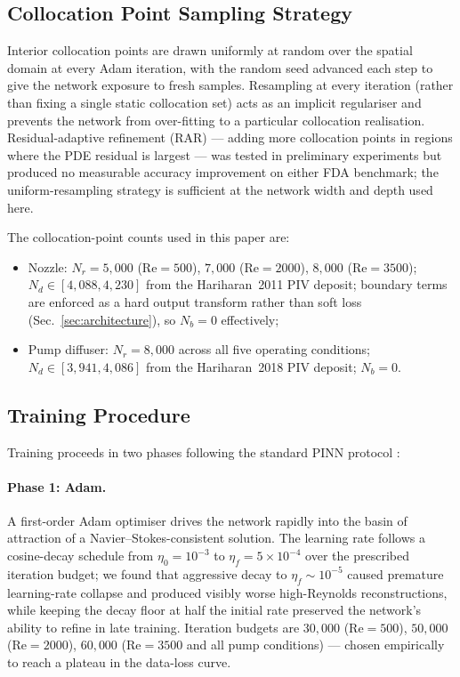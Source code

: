 \documentclass[12pt,a4paper]{article}
\newcommand{\Reyn}{\mathrm{Re}}    %
\begin{document}
\subsection{Collocation Point Sampling Strategy}
\label{sec:sampling}

Interior collocation points are drawn uniformly at random over
the spatial domain at every Adam iteration, with the random
seed advanced each step to give the network exposure to fresh
samples. Resampling at every iteration (rather than fixing a
single static collocation set) acts as an implicit regulariser
and prevents the network from over-fitting to a particular
collocation realisation. Residual-adaptive refinement (RAR)
\cite{Wu2023RAR} --- adding more collocation points in regions
where the PDE residual is largest --- was tested in preliminary
experiments but produced no measurable accuracy improvement on
either FDA benchmark; the uniform-resampling strategy is
sufficient at the network width and depth used here.

The collocation-point counts used in this paper are:
\begin{itemize}[leftmargin=*, itemsep=2pt]
  \item Nozzle: $N_r = 5{,}000$ ($\Reyn = 500$),
        $7{,}000$ ($\Reyn = 2000$), $8{,}000$ ($\Reyn = 3500$);
        $N_d \in [4{,}088, 4{,}230]$ from the Hariharan~2011
        PIV deposit; boundary terms are enforced as a hard
        output transform rather than soft loss
        (Sec.~\ref{sec:architecture}), so $N_b = 0$ effectively;
  \item Pump diffuser: $N_r = 8{,}000$ across all five
        operating conditions; $N_d \in [3{,}941, 4{,}086]$
        from the Hariharan~2018 PIV deposit; $N_b = 0$.
\end{itemize}

\subsection{Training Procedure}
\label{sec:training}

Training proceeds in two phases following the standard PINN
protocol \cite{Raissi2019PINN1, Lu2021DeepXDE}:

\paragraph{Phase 1: Adam.} A first-order Adam optimiser
\cite{Kingma2015Adam} drives the network rapidly into the
basin of attraction of a Navier--Stokes-consistent solution.
The learning rate follows a cosine-decay schedule from
$\eta_0 = 10^{-3}$ to $\eta_f = 5 \times 10^{-4}$ over the
prescribed iteration budget; we found that aggressive decay
to $\eta_f \sim 10^{-5}$ caused premature
learning-rate collapse and produced visibly worse high-Reynolds
reconstructions, while keeping the decay floor at half the
initial rate preserved the network's ability to refine in late
training. Iteration budgets are $30{,}000$ ($\Reyn = 500$),
$50{,}000$ ($\Reyn = 2000$), $60{,}000$ ($\Reyn = 3500$ and all
pump conditions) --- chosen empirically to reach a plateau in
the data-loss curve.
\end{document}
